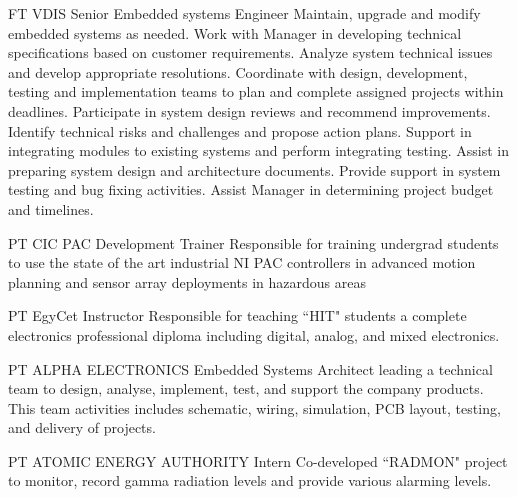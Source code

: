 \documentclass[10pt]{article} %
\begin{document}
\begin{paracol}{2}
{FT} %
{VDIS} %
{Senior Embedded systems Engineer} %
{Maintain, upgrade and modify embedded systems as needed.
Work with Manager in developing technical specifications based on customer requirements.
Analyze system technical issues and develop appropriate resolutions.
Coordinate with design, development, testing and implementation teams to plan and complete assigned projects within deadlines.
Participate in system design reviews and recommend improvements.
Identify technical risks and challenges and propose action plans.
Support in integrating modules to existing systems and perform integrating testing.
Assist in preparing system design and architecture documents.
Provide support in system testing and bug fixing activities.
Assist Manager in determining project budget and timelines.} %


{PT} %
{CIC} %
{PAC Development Trainer} %
{Responsible for training undergrad students to use the state of the art industrial NI PAC controllers in advanced motion planning and sensor array deployments in hazardous areas}  %


{PT} %
{EgyCet} %
{Instructor} %
{Responsible for teaching ``HIT" students a complete electronics professional diploma including digital, analog, and mixed electronics.} %

{PT} %
{ALPHA ELECTRONICS} %
{Embedded Systems Architect} %
{leading a technical team to design, analyse, implement, test, and support the company products. This team activities includes schematic, wiring, simulation, PCB layout, testing, and delivery of projects.} %

{PT} %
{ATOMIC ENERGY AUTHORITY} %
{Intern} %
{Co-developed ``RADMON" project to monitor, record gamma radiation levels and provide various alarming levels.}


\end{paracol}
\end{document}
